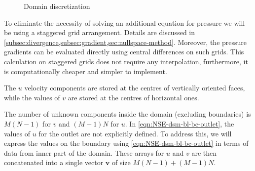 \documentclass{article}
\numberwithin{equation}{section}
\begin{document}
\begin{figure}[H] %
  \caption{Domain discretization}\label{bl-domain-discretization}
\end{figure}

To eliminate the necessity of solving an additional equation for pressure we will be using a staggered grid arrangement. Details are discussed in \cref{subsec:divergence,subsec:gradient,sec:nullspace-method}. 
Moreover, the pressure gradients can be evaluated directly using central differences on such grids. 
This calculation on staggered grids does not require any interpolation, furthermore, it is computationally cheaper and simpler to implement. 

The $u$ velocity components are stored at the centres of vertically oriented faces, while the values of $v$ are stored at the centres of horizontal ones. 

The number of unknown components inside the domain (excluding boundaries) is $M(N-1)$ for $v$ and $(M-1)N$ for $u$. In \cref{eqn:NSE-dsm-bl-bc-outlet}, the values of $u$ for the outlet are not explicitly defined. To address this, we will express the values on the boundary using \cref{eqn:NSE-dsm-bl-bc-outlet} in terms of data from inner part of the domain. These arrays for $u$ and $v$ are then concatenated into a single vector $\boldsymbol{v}$ of size $M(N-1)+(M-1)N$.
\end{document}
